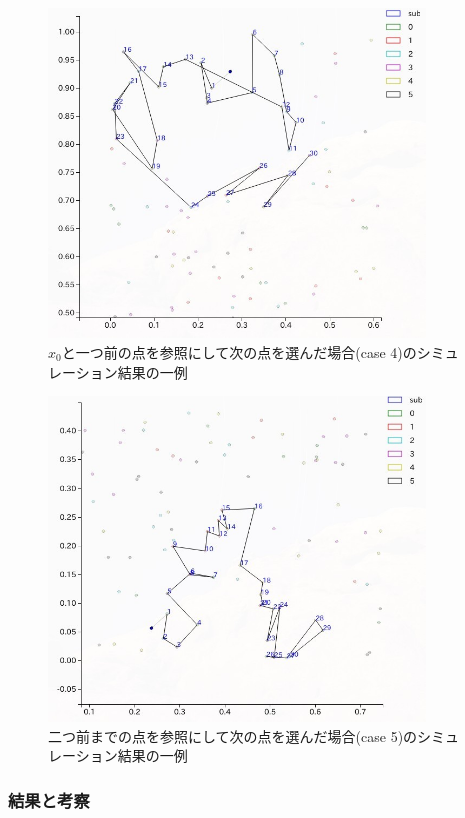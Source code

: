 \begin{figure}[H]
    \begin{center}
        \includegraphics[width=10cm]{../simple3/case_4.jpg}
        \caption{$x_{0}$と一つ前の点を参照にして次の点を選んだ場合(case 4)のシミュレーション結果の一例}
        \label{fig:f11}
    \end{center}
\end{figure}
\begin{figure}[H]
    \begin{center}
        \includegraphics[width=10cm]{../simple3/case_5.jpg}
        \caption{二つ前までの点を参照にして次の点を選んだ場合(case 5)のシミュレーション結果の一例}
        \label{fig:f12}
    \end{center}
\end{figure}

\subsubsection{結果と考察}

